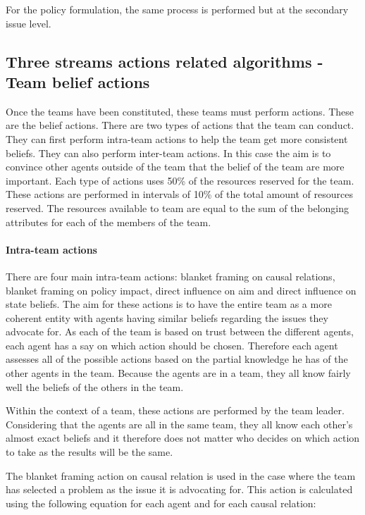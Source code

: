 For the policy formulation, the same process is performed but at the secondary issue level.

\subsection{Three streams actions related algorithms - Team belief actions}

Once the teams have been constituted, these teams must perform actions. These are the belief actions. There are two types of actions that the team can conduct. They can first perform intra-team actions to help the team get more consistent beliefs. They can also perform inter-team actions. In this case the aim is to convince other agents outside of the team that the belief of the team are more important. Each type of actions uses 50\% of the resources reserved for the team. These actions are performed in intervals of 10\% of the total amount of resources reserved. The resources available to team are equal to the sum of the belonging attributes for each of the members of the team.

\paragraph{Intra-team actions}

There are four main intra-team actions: blanket framing on causal relations, blanket framing on policy impact, direct influence on aim and direct influence on state beliefs. The aim for these actions is to have the entire team as a more coherent entity with agents having similar beliefs regarding the issues they advocate for. As each of the team is based on trust between the different agents, each agent has a say on which action should be chosen. Therefore each agent assesses all of the possible actions based on the partial knowledge he has of the other agents in the team. Because the agents are in a team, they all know fairly well the beliefs of the others in the team.

Within the context of a team, these actions are performed by the team leader. Considering that the agents are all in the same team, they all know each other's almost exact beliefs and it therefore does not matter who decides on which action to take as the results will be the same.

The blanket framing action on causal relation is used in the case where the team has selected a problem as the issue it is advocating for. This action is calculated using the following equation for each agent and for each causal relation:

